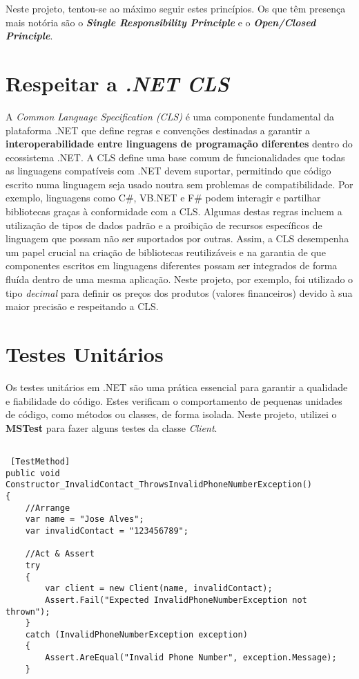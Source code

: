 \documentclass[11pt]{scrartcl} %
\begin{document}
Neste projeto, tentou-se ao máximo seguir estes princípios. Os que têm presença mais notória são o \textbf{\textit{Single Responsibility Principle}} e o \textbf{\textit{Open/Closed Principle}}.

\section{Respeitar a \textbf{\textit{.NET CLS}}}
A \textit{Common Language Specification (CLS)} é uma componente fundamental da plataforma .NET que define regras e convenções destinadas a garantir a \textbf{interoperabilidade entre linguagens de programação diferentes} dentro do ecossistema .NET. A CLS define uma base comum de funcionalidades que todas as linguagens compatíveis com .NET devem suportar, permitindo que código escrito numa linguagem seja usado noutra sem problemas de compatibilidade. Por exemplo, linguagens como C\#, VB.NET e F\# podem interagir e partilhar bibliotecas graças à conformidade com a CLS. Algumas destas regras incluem a utilização de tipos de dados padrão e a proibição de recursos específicos de linguagem que possam não ser suportados por outras. Assim, a CLS desempenha um papel crucial na criação de bibliotecas reutilizáveis e na garantia de que componentes escritos em linguagens diferentes possam ser integrados de forma fluída dentro de uma mesma aplicação.
Neste projeto, por exemplo, foi utilizado o tipo \textit{decimal} para definir os preços dos produtos (valores financeiros) devido à sua maior precisão e respeitando a CLS. 

\newpage

\section{Testes Unitários}
Os testes unitários em .NET são uma prática essencial para garantir a qualidade e fiabilidade do código. Estes verificam o comportamento de pequenas unidades de código, como métodos ou classes, de forma isolada. Neste projeto, utilizei o \textbf{MSTest} para fazer alguns testes da classe \textit{Client}.

\begin{lstlisting}[language={[Sharp]C}, caption={Teste Unitário do construtor de Client, quando é indicado um contacto inválido}, label={Teste Client com contacto errado}]
	
 [TestMethod]
public void Constructor_InvalidContact_ThrowsInvalidPhoneNumberException()
{
	//Arrange
	var name = "Jose Alves";
	var invalidContact = "123456789";
	
	//Act & Assert
	try
	{
		var client = new Client(name, invalidContact);
		Assert.Fail("Expected InvalidPhoneNumberException not thrown");
	}
	catch (InvalidPhoneNumberException exception)
	{
		Assert.AreEqual("Invalid Phone Number", exception.Message);
	}
\end{lstlisting}
\end{document}
